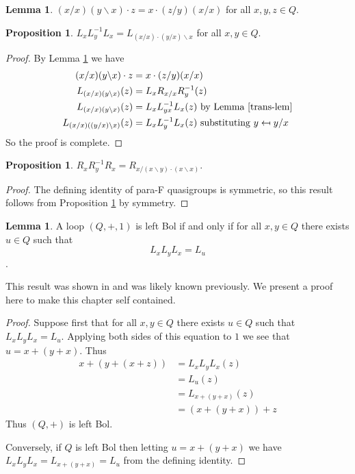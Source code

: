 \documentclass[12pt]{report}
\theoremstyle{definition}
\newtheorem{lem}[thm]{Lemma}
\newtheorem{prp}[thm]{Proposition}
\newcommand{\ldv}{\backslash}       %
\newcommand{\rdv}{/}                %
\begin{document}
\begin{lem}\label{iso-lem}
  $(x\rdv x)(y\ldv x)\cdot z = x\cdot (z\rdv y)(x\rdv x)$ for all $x, y, z\in Q$.
\end{lem}

\begin{prp}\label{BI}
  $L_x L_y^{-1} L_x = L_{(x\rdv x)\cdot (y\rdv x)\ldv x}$ for all $x, y\in Q$. 
\end{prp}

\begin{proof}
  By Lemma \ref{iso-lem} we have
  \begin{align*}
    (x\rdv x)(y\ldv x)\cdot z &= x\cdot (z\rdv y)(x\rdv x)\\
    L_{(x\rdv x)(y\ldv x)}(z) &= L_x R_{x\rdv x} R_y^{-1}(z)\\
    L_{(x\rdv x)(y\ldv x)}(z) &= L_x L_{yx}^{-1} L_x(z)\text{ by Lemma \ref{trans-lem}}\\
    L_{(x\rdv x)((y\rdv x)\ldv x)}(z) &= L_x L_y^{-1} L_x(z)\text{ substituting $y\mapsfrom y\rdv x$}
  \end{align*}
  So the proof is complete.
\end{proof}

\begin{prp}\label{BI-dual}
  $R_x R_y^{-1} R_x = R_{x\rdv (x\ldv y)\cdot (x\ldv x)}$.
\end{prp}

\begin{proof}
  The defining identity of para-F quasigroups is symmetric, so this result follows from Proposition \ref{BI}
    by symmetry.
\end{proof}

\begin{lem}\label{bol-char}
  A loop $(Q, +, 1)$ is left Bol if and only if for all $x, y\in Q$ there exists $u \in Q$ such that 
  \[L_x L_y L_x = L_u\] \cite{BK-isotopes}.
\end{lem}

This result was shown in \cite{BK-isotopes} and was likely known previously. We present a proof here to
  make this chapter self contained.

\begin{proof}
  Suppose first that for all $x, y \in Q$ there exists $u\in Q$ such that $L_x L_y L_x = L_u$. Applying
    both sides of this equation to $1$ we see that $u = x + (y + x)$. Thus
  \begin{align*}
    x + (y + (x + z)) &= L_x L_y L_x(z)\\
    &= L_u(z)\\
    &= L_{x + (y + x)}(z)\\
    &= (x + (y + x)) + z
  \end{align*}
  Thus $(Q, +)$ is left Bol.

  Conversely, if $Q$ is left Bol then letting $u = x + (y + x)$ we
    have $L_x L_y L_x = L_{x + (y + x)} = L_u$ from the defining identity.
\end{proof}
\end{document}
